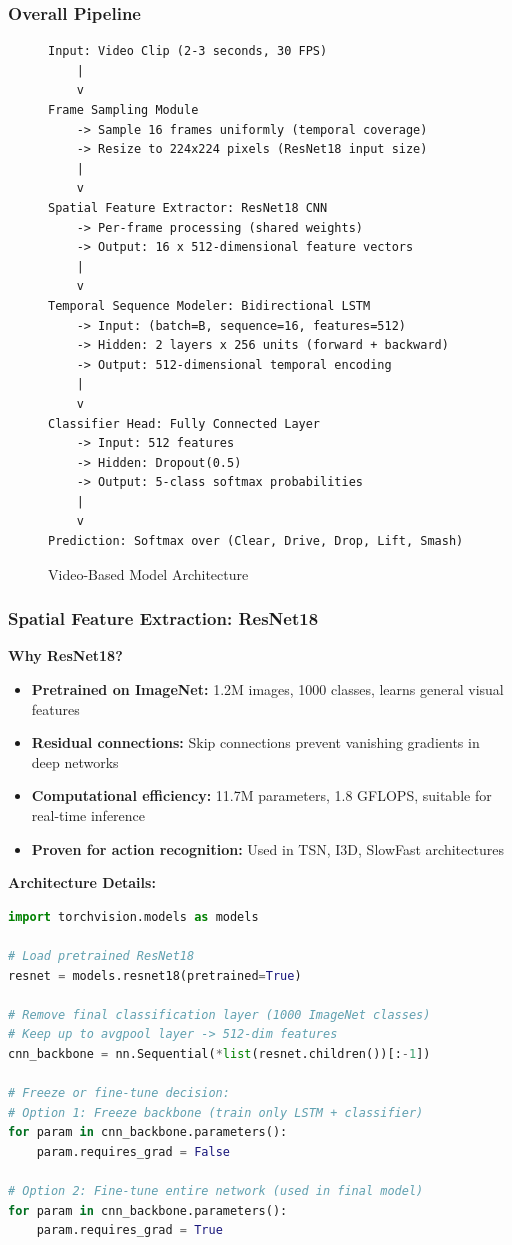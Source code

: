 \documentclass[11pt,a4paper]{article}
\begin{document}
\subsubsection{Overall Pipeline}

\begin{figure}[H]
\centering
\begin{verbatim}
Input: Video Clip (2-3 seconds, 30 FPS)
    |
    v
Frame Sampling Module
    -> Sample 16 frames uniformly (temporal coverage)
    -> Resize to 224x224 pixels (ResNet18 input size)
    |
    v
Spatial Feature Extractor: ResNet18 CNN
    -> Per-frame processing (shared weights)
    -> Output: 16 x 512-dimensional feature vectors
    |
    v
Temporal Sequence Modeler: Bidirectional LSTM
    -> Input: (batch=B, sequence=16, features=512)
    -> Hidden: 2 layers x 256 units (forward + backward)
    -> Output: 512-dimensional temporal encoding
    |
    v
Classifier Head: Fully Connected Layer
    -> Input: 512 features
    -> Hidden: Dropout(0.5)
    -> Output: 5-class softmax probabilities
    |
    v
Prediction: Softmax over (Clear, Drive, Drop, Lift, Smash)
\end{verbatim}
\caption{Video-Based Model Architecture}
\end{figure}

\subsubsection{Spatial Feature Extraction: ResNet18}

\textbf{Why ResNet18?}

\begin{itemize}
\item \textbf{Pretrained on ImageNet:} 1.2M images, 1000 classes, learns general visual features
\item \textbf{Residual connections:} Skip connections prevent vanishing gradients in deep networks
\item \textbf{Computational efficiency:} 11.7M parameters, 1.8 GFLOPS, suitable for real-time inference
\item \textbf{Proven for action recognition:} Used in TSN, I3D, SlowFast architectures
\end{itemize}

\textbf{Architecture Details:}
\begin{lstlisting}[language=Python, caption=ResNet18 Backbone Configuration]
import torchvision.models as models

# Load pretrained ResNet18
resnet = models.resnet18(pretrained=True)

# Remove final classification layer (1000 ImageNet classes)
# Keep up to avgpool layer -> 512-dim features
cnn_backbone = nn.Sequential(*list(resnet.children())[:-1])

# Freeze or fine-tune decision:
# Option 1: Freeze backbone (train only LSTM + classifier)
for param in cnn_backbone.parameters():
    param.requires_grad = False

# Option 2: Fine-tune entire network (used in final model)
for param in cnn_backbone.parameters():
    param.requires_grad = True
\end{lstlisting}
\end{document}

